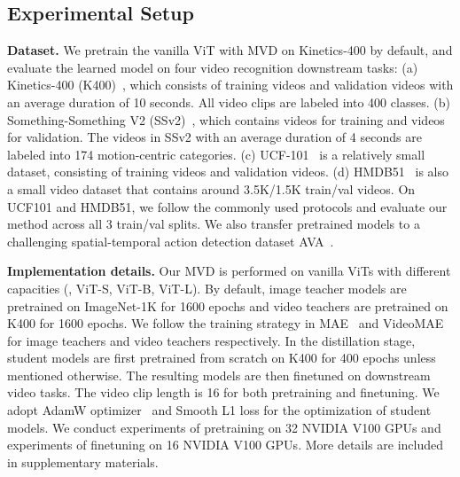 \documentclass[10pt,twocolumn,letterpaper]{article}
\begin{document}
\subsection{Experimental Setup}
\label{sec:setup}
\noindent \textbf{Dataset.} We pretrain the vanilla ViT with MVD on Kinetics-400 by default, and evaluate the learned model on four video recognition downstream tasks: (a) Kinetics-400 (K400)~\cite{quovadis}, which consists of  training videos and  validation videos with an average duration of 10 seconds. All video clips are labeled into 400 classes. (b) Something-Something V2 (SSv2)~\cite{ssv2}, which contains  videos for training and  videos for validation. The videos in SSv2 with an average duration of 4 seconds are labeled into 174 motion-centric categories. (c) UCF-101~\cite{ucf101} is a relatively small dataset, consisting of  training videos and  validation videos. (d) HMDB51~\cite{kuehne2011hmdb} is also a small video dataset that contains around 3.5K/1.5K train/val videos. On UCF101 and HMDB51, we follow the commonly used protocols and evaluate our method across all 3 train/val splits. We also transfer pretrained models to a challenging spatial-temporal action detection dataset AVA~\cite{gu2018ava}.

\vspace{0.05in}
\noindent \textbf{Implementation details.} Our MVD is performed on vanilla ViTs with different capacities (\ie, ViT-S, ViT-B, ViT-L). By default, image teacher models are pretrained on ImageNet-1K for 1600 epochs and video teachers are pretrained on K400 for 1600 epochs. We follow the training strategy in MAE~\cite{he2021masked} and VideoMAE~\cite{feichtenhofer2022masked} for image teachers and video teachers respectively. In the distillation stage, student models are first pretrained from scratch on K400 for 400 epochs unless mentioned otherwise. The resulting models are then finetuned on downstream video tasks. The video clip length is 16 for both pretraining and finetuning. We adopt AdamW optimizer~\cite{loshchilov2018decoupled} and Smooth L1 loss for the optimization of student models. We conduct experiments of pretraining on 32 NVIDIA V100 GPUs and experiments of finetuning on 16 NVIDIA V100 GPUs. More details are included in supplementary materials.
\end{document}
